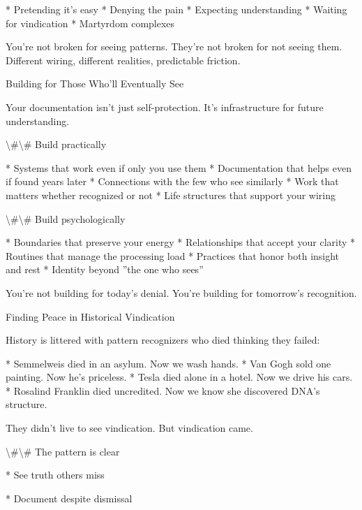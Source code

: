 \documentclass[12pt,oneside]{book}
\begin{document}
                    * Pretending it's easy
                    * Denying the pain
                    * Expecting understanding
                    * Waiting for vindication
                    * Martyrdom complexes

You're not broken for seeing patterns. They're not broken for not seeing them. Different wiring, different realities, predictable friction.

Building for Those Who'll Eventually See

Your documentation isn't just self-protection. It's infrastructure for future understanding.

\textbackslash{}#\textbackslash{}# Build practically

                    * Systems that work even if only you use them
                    * Documentation that helps even if found years later
                    * Connections with the few who see similarly
                    * Work that matters whether recognized or not
                    * Life structures that support your wiring

\textbackslash{}#\textbackslash{}# Build psychologically

                    * Boundaries that preserve your energy
                    * Relationships that accept your clarity
                    * Routines that manage the processing load
                    * Practices that honor both insight and rest
                    * Identity beyond ''the one who sees''

You're not building for today's denial. You're building for tomorrow's recognition.

Finding Peace in Historical Vindication

History is littered with pattern recognizers who died thinking they failed:

                    * Semmelweis died in an asylum. Now we wash hands.
                    * Van Gogh sold one painting. Now he's priceless.
                    * Tesla died alone in a hotel. Now we drive his cars.
                    * Rosalind Franklin died uncredited. Now we know she discovered DNA's structure.

They didn't live to see vindication. But vindication came.

\textbackslash{}#\textbackslash{}# The pattern is clear

                    * See truth others miss

                    * Document despite dismissal
\end{document}
